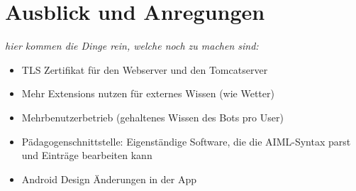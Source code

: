 \section{Ausblick und Anregungen}
	\textsl{hier kommen die Dinge rein, welche noch zu machen sind:}
	\begin{itemize}\itemsep0pt
		\item{TLS Zertifikat für den Webserver und den Tomcatserver}
		\item{Mehr Extensions nutzen für externes Wissen (wie Wetter)}
		\item{Mehrbenutzerbetrieb (gehaltenes Wissen des Bots pro User)}
		\item{Pädagogenschnittstelle: Eigenständige Software, die die AIML-Syntax
		parst und Einträge bearbeiten kann}
		\item{Android Design Änderungen in der App}
	\end{itemize}